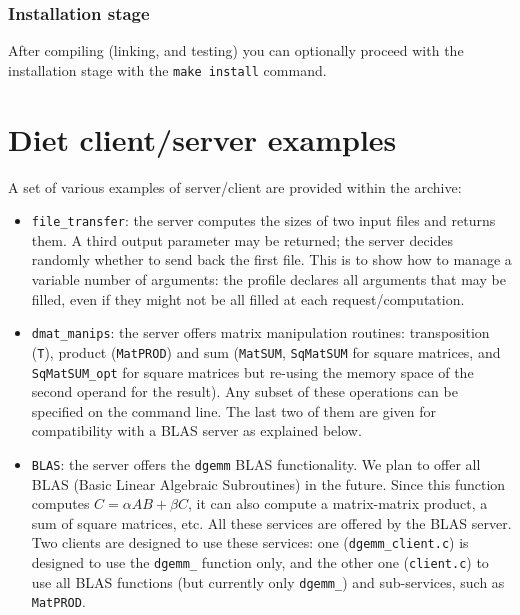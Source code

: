 \subsubsection{Installation stage}
After compiling (linking, and testing) you can optionally proceed with the
installation stage with the \verb+make install+ command.

\section{Diet client/server examples}
\label{section:diet-examples}

A set of various examples of \diet server/client are provided within the \diet
archive:
\begin{itemize}
\item{\texttt{file\_transfer}}: the server computes the sizes of two input
  files and returns them. A third output parameter may be returned; the server
  decides randomly whether to send back the first file. This is to show how to
  manage a variable number of arguments: the profile declares all arguments
  that may be filled, even if they might not be all filled at each
  request/computation.

\item{\texttt{dmat\_manips}}: the server offers matrix manipulation routines:
  transposition (\texttt{T}), product (\texttt{MatPROD}) and sum
  (\texttt{MatSUM}, \texttt{SqMatSUM} for square matrices, and
  \texttt{SqMatSUM\_opt} for square matrices but re-using the memory space of
  the second operand for the result). Any subset of these operations can be
  specified on the command line. The last two of them are given for
  compatibility with a BLAS server as explained below.
  
\item{\texttt{BLAS}}: the server offers the \texttt{dgemm} BLAS
  functionality. We plan to offer all BLAS (Basic Linear Algebraic Subroutines)
  in the future. Since this function computes $C = \alpha AB + \beta C$, it can
  also compute a matrix-matrix product, a sum of square matrices, etc. All
  these services are offered by the BLAS server. Two clients are designed to
  use these services: one (\texttt{dgemm\_client.c}) is designed to use the
  \texttt{dgemm\_} function only, and the other one (\texttt{client.c}) to use
  all BLAS functions (but currently only \texttt{dgemm\_}) and sub-services,
  such as \texttt{MatPROD}.
  

\end{itemize}
